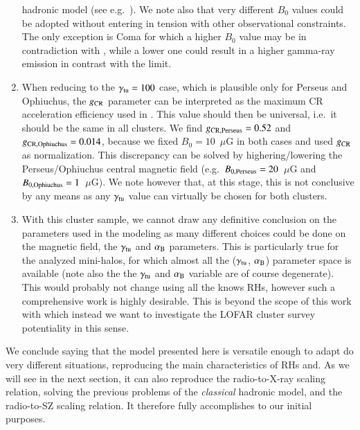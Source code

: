 \documentclass[traditabstract]{aa}
\begin{document}
\begin{enumerate}
       hadronic model (see e.g.~\citealp{2011ApJ...728...53J}). We note also that very different $B_{0}$ values could be adopted without entering 
       in tension with other observational constraints. The only exception is Coma for which a higher $B_{0}$ value may be in contradiction 
       with \cite{2010A&A...513A..30B}, while a lower one could result in a higher gamma-ray emission in contrast with the \cite{2012AAS...21920701Z}
       limit.
 \item When reducing to the $\gamma_{\rm{tu}}=100$ case, which is plausible only for Perseus and Ophiuchus, the $g_{\rm{CR}}$ parameter can be interpreted as the maximum
       CR acceleration efficiency used in \cite{2010MNRAS.409..449P}. This value should then be universal, i.e.~it should be the same in all clusters. We find 
       $g_{\rm{CR, Perseus}} = 0.52$ and $g_{\rm{CR, Ophiuchus}} = 0.014$, because we fixed $B_{0}=10$~$\mu$G in both cases and used $g_{\rm{CR}}$ as normalization. This 
       discrepancy can be solved by highering/lowering the Perseus/Ophiuchus central magnetic field (e.g.~$B_{0,\rm{Perseus}}=20$~$\mu$G and 
       $B_{0,\rm{Ophiuchus}}=1$~$\mu$G). We note however that, at this stage, this is not conclusive by any means as any $\gamma_{\rm{tu}}$ value can 
       virtually be chosen for both clusters. 
 \item With this cluster sample, we cannot draw any definitive conclusion on the parameters used in the modeling as many different choices could be done on
       the magnetic field, the $\gamma_{\rm{tu}}$ and $\alpha_{\rm{B}}$ parameters. This is particularly true for the analyzed mini-halos, for which almost all the
       ($\gamma_{\rm{tu}}$, $\alpha_{\rm{B}}$) parameter space is available (note also the the $\gamma_{\rm{tu}}$ and $\alpha_{\rm{B}}$ variable are of course degenerate). This 
       would probably not change using all the knows RHs, however such a comprehensive work is highly desirable. This is beyond the scope of this work with which instead we 
       want to investigate the LOFAR cluster survey potentiality in this sense.
\end{enumerate}

We conclude saying that the model presented here is versatile enough to adapt do very different situations, reproducing the main characteristics of RHs and. As we will see in
the next section, it can also reproduce the radio-to-X-ray scaling relation, solving the previous problems of the \emph{classical} hadronic model, and the radio-to-SZ scaling relation. It therefore fully accomplishes to our initial purposes.
\end{document}
